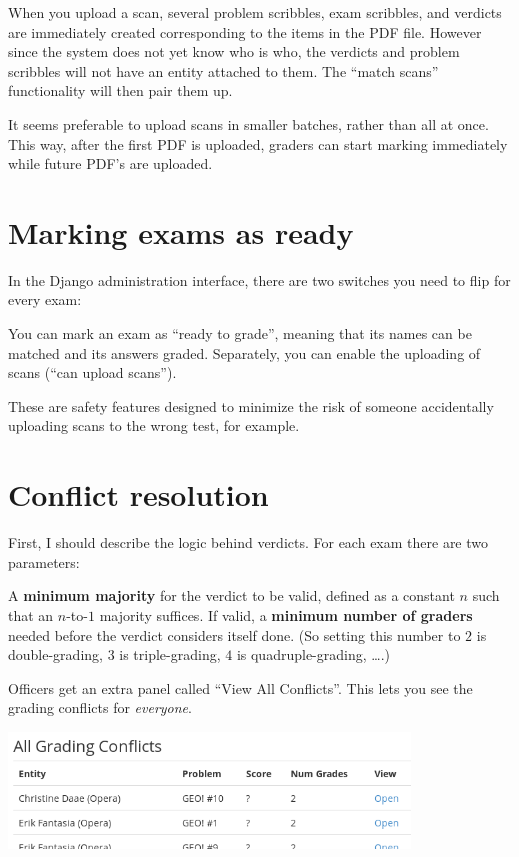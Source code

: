 When you upload a scan,
several problem scribbles, exam scribbles, and verdicts
are immediately created corresponding to the items in the PDF file.
However since the system does not yet know who is who,
the verdicts and problem scribbles will not have an entity attached to them.
The ``match scans'' functionality will then pair them up.

It seems preferable to upload scans in smaller batches,
rather than all at once.
This way, after the first PDF is uploaded,
graders can start marking immediately
while future PDF's are uploaded.

\section{Marking exams as ready}
In the Django administration interface,
there are two switches you need to flip for every exam:
\begin{itemize}
	\ii You can mark an exam as ``ready to grade'',
	meaning that its names can be matched and its answers graded.
	\ii Separately, you can enable the uploading of scans
	(``can upload scans'').
\end{itemize}
These are safety features designed to minimize the risk
of someone accidentally uploading scans to the wrong test, for example.

\section{Conflict resolution}
First, I should describe the logic behind verdicts.
For each exam there are two parameters:
\begin{itemize}
	\ii A \textbf{minimum majority} for the verdict to be valid,
	defined as a constant $n$ such that an $n$-to-$1$ majority suffices.
	\ii If valid, a \textbf{minimum number of graders} needed before
	the verdict considers itself done.
	(So setting this number to $2$ is double-grading,
	$3$ is triple-grading, $4$ is quadruple-grading, \dots.)
\end{itemize}

Officers get an extra panel called ``View All Conflicts''.
This lets you see the grading conflicts for \emph{everyone}.

\begin{center}
	\includegraphics[width=0.8\textwidth]{images/all-conflict.png}
\end{center}

